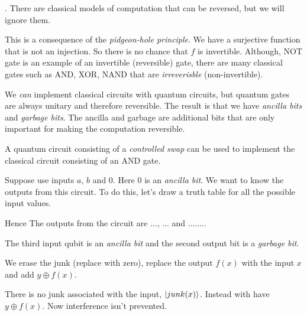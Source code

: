 . 
There are classical models of computation that can be reversed, but we will ignore them.



This is a consequence of the \textit{pidgeon-hole principle}. 
We have a surjective function that is not an injection. So 
there is no chance that $f$ is invertible. 
Although, NOT gate is an example of an invertible (reversible) gate,
there are many classical gates such as AND, XOR, NAND that are \textit{irreverisble} (non-invertible).

We \textit{can} implement classical circuits with quantum circuits, 
but quantum gates are always unitary and therefore reversible. 
The result is that we have \textit{ancilla bits} and \textit{garbage bits}. 
The ancilla and garbage are additional bits that are only important for 
making the computation reversible.


\begin{example}
A quantum circuit consisting of a \textit{controlled swap} can be used to 
implement the classical circuit consisting of an AND gate.

Suppose use inputs $a$, $b$ and 0. Here 0 is an \textit{ancilla bit}.
We want to know the outputs from this circuit. To do this, 
let's draw a truth table for all the possible input values.




Hence The outputs from the circuit are ..., ... and ........


The third input qubit is an 
\textit{ancilla bit} and the second output bit 
is a \textit{garbage bit}.




We erase the junk (replace with zero), 
replace the output $f(x)$ with the input $x$ 
and add $y \oplus f(x)$.

There is no junk associated with the input, $\left|junk(x)\right\rangle$.
Instead with have $y \oplus f(x)$. Now interference isn't prevented.


\end{example}